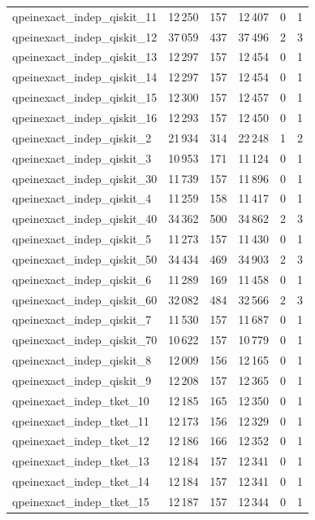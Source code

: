 \begin{longtable}{lrrrrr}
qpeinexact\_indep\_qiskit\_11 & 12\,250 & 157 & 12\,407 & 0 & 1 \\
qpeinexact\_indep\_qiskit\_12 & 37\,059 & 437 & 37\,496 & 2 & 3 \\
qpeinexact\_indep\_qiskit\_13 & 12\,297 & 157 & 12\,454 & 0 & 1 \\
qpeinexact\_indep\_qiskit\_14 & 12\,297 & 157 & 12\,454 & 0 & 1 \\
qpeinexact\_indep\_qiskit\_15 & 12\,300 & 157 & 12\,457 & 0 & 1 \\
qpeinexact\_indep\_qiskit\_16 & 12\,293 & 157 & 12\,450 & 0 & 1 \\
qpeinexact\_indep\_qiskit\_2 & 21\,934 & 314 & 22\,248 & 1 & 2 \\
qpeinexact\_indep\_qiskit\_3 & 10\,953 & 171 & 11\,124 & 0 & 1 \\
qpeinexact\_indep\_qiskit\_30 & 11\,739 & 157 & 11\,896 & 0 & 1 \\
qpeinexact\_indep\_qiskit\_4 & 11\,259 & 158 & 11\,417 & 0 & 1 \\
qpeinexact\_indep\_qiskit\_40 & 34\,362 & 500 & 34\,862 & 2 & 3 \\
qpeinexact\_indep\_qiskit\_5 & 11\,273 & 157 & 11\,430 & 0 & 1 \\
qpeinexact\_indep\_qiskit\_50 & 34\,434 & 469 & 34\,903 & 2 & 3 \\
qpeinexact\_indep\_qiskit\_6 & 11\,289 & 169 & 11\,458 & 0 & 1 \\
qpeinexact\_indep\_qiskit\_60 & 32\,082 & 484 & 32\,566 & 2 & 3 \\
qpeinexact\_indep\_qiskit\_7 & 11\,530 & 157 & 11\,687 & 0 & 1 \\
qpeinexact\_indep\_qiskit\_70 & 10\,622 & 157 & 10\,779 & 0 & 1 \\
qpeinexact\_indep\_qiskit\_8 & 12\,009 & 156 & 12\,165 & 0 & 1 \\
qpeinexact\_indep\_qiskit\_9 & 12\,208 & 157 & 12\,365 & 0 & 1 \\
qpeinexact\_indep\_tket\_10 & 12\,185 & 165 & 12\,350 & 0 & 1 \\
qpeinexact\_indep\_tket\_11 & 12\,173 & 156 & 12\,329 & 0 & 1 \\
qpeinexact\_indep\_tket\_12 & 12\,186 & 166 & 12\,352 & 0 & 1 \\
qpeinexact\_indep\_tket\_13 & 12\,184 & 157 & 12\,341 & 0 & 1 \\
qpeinexact\_indep\_tket\_14 & 12\,184 & 157 & 12\,341 & 0 & 1 \\
qpeinexact\_indep\_tket\_15 & 12\,187 & 157 & 12\,344 & 0 & 1 \\

\end{longtable}
